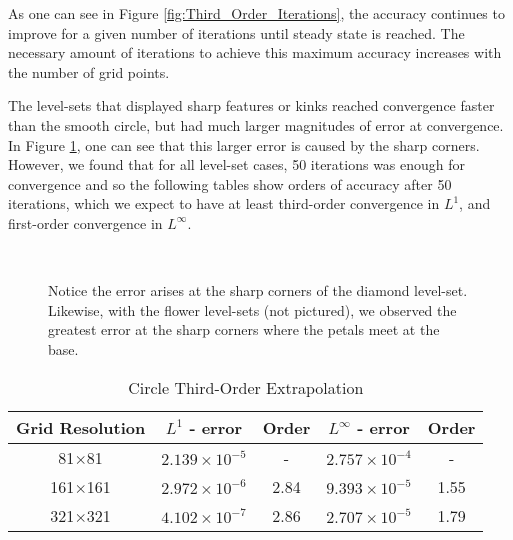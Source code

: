 \documentclass[oneside,12pt,final]{/Applications/TeX/packages/ucthesis-CA2012}
\begin{document}
\begin{mainmatter}
As one can see in Figure \ref{fig:Third_Order_Iterations}, the accuracy continues to improve for a given number of iterations until steady state is reached. The necessary amount of iterations to achieve this maximum accuracy increases with the number of grid points.

The level-sets that displayed sharp features or kinks reached convergence faster than the smooth circle, but had much larger magnitudes of error at convergence. In Figure \ref{fig:Third_Order_Error_sharp}, one can see that this larger error is caused by the sharp corners. However, we found that for all level-set cases, 50 iterations was enough for convergence and so the following tables show orders of accuracy after 50 iterations, which we expect to have at least third-order convergence in $L^1$, and first-order convergence in $L^\infty$.


\begin{figure} [!h]
\centering
{} \quad
{}\\
  \caption[Location of Error in Third-Order Extrapolation Method]{Notice the error arises at the sharp corners of the diamond level-set. Likewise, with the flower level-sets (not pictured), we observed the greatest error at the sharp corners where the petals meet at the base.}
  \label{fig:Third_Order_Error_sharp}
\end{figure}


\begin{table} [!h]
\caption{Circle Third-Order Extrapolation}
\centering
\begin{tabular}{c c c c c}
\hline
Grid Resolution & $L^1$ - error           & Order  & $L^{\infty}$ - error        & Order \\ \hline
81$\times$81     & $2.139 \times 10^{-5}$  &   -    & $2.757 \times 10^{-4}$  &  -    \\
161$\times$161   & $2.972 \times 10^{-6}$  &  2.84  & $9.393 \times 10^{-5}$   & 1.55  \\
321$\times$321   & $4.102 \times 10^{-7}$ &  2.86  & $2.707 \times 10^{-5}$   & 1.79  \\
\end{tabular}
\end{table}


\end{mainmatter}
\end{document}
